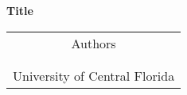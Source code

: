 \documentclass[letterpaper,11pt]{article}
\begin{document}
\begin{titlepage}
\begin{center}
{\bf Title} \\
\vspace{0.1in}
\begin{tabular}{c}
{Authors}  \\
{}\\
{} \\
{University of Central Florida}  \\
\end{tabular}
\end{center}
\end{titlepage}

\begingroup
\tableofcontents {}
\let\clearpage\relax
\listoffigures {}
\listoftables {}
\endgroup



\newpage
\clearpage
\thispagestyle{empty}
\pagestyle{empty}

\renewcommand{\refname}{\centerline{\Large\bf References Cited}}


\end{document}
